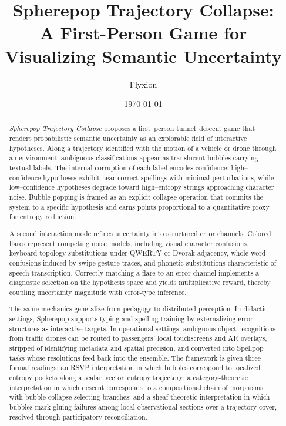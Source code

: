 \documentclass[11pt]{article}
\begin{document}
\title{Spherepop Trajectory Collapse:\\
A First-Person Game for Visualizing Semantic Uncertainty}

\author{Flyxion}

\date{\today}

\maketitle

\begin{abstract}
\noindent
\emph{Spherepop Trajectory Collapse} proposes a first--person tunnel--descent game that renders probabilistic semantic uncertainty as an explorable field of interactive hypotheses. Along a trajectory identified with the motion of a vehicle or drone through an environment, ambiguous classifications appear as translucent bubbles carrying textual labels. The internal corruption of each label encodes confidence: high--confidence hypotheses exhibit near-correct spellings with minimal perturbations, while low--confidence hypotheses degrade toward high--entropy strings approaching character noise. Bubble popping is framed as an explicit collapse operation that commits the system to a specific hypothesis and earns points proportional to a quantitative proxy for entropy reduction.

A second interaction mode refines uncertainty into structured error channels. Colored flares represent competing noise models, including visual character confusions, keyboard-topology substitutions under QWERTY or Dvorak adjacency, whole-word confusions induced by swipe-gesture traces, and phonetic substitutions characteristic of speech transcription. Correctly matching a flare to an error channel implements a diagnostic selection on the hypothesis space and yields multiplicative reward, thereby coupling uncertainty magnitude with error-type inference.

The same mechanics generalize from pedagogy to distributed perception. In didactic settings, Spherepop supports typing and spelling training by externalizing error structures as interactive targets. In operational settings, ambiguous object recognitions from traffic drones can be routed to passengers’ local touchscreens and AR overlays, stripped of identifying metadata and spatial precision, and converted into Spellpop tasks whose resolutions feed back into the ensemble. The framework is given three formal readings: an RSVP interpretation in which bubbles correspond to localized entropy pockets along a scalar--vector--entropy trajectory; a category-theoretic interpretation in which descent corresponds to a compositional chain of morphisms with bubble collapse selecting branches; and a sheaf-theoretic interpretation in which bubbles mark gluing failures among local observational sections over a trajectory cover, resolved through participatory reconciliation.
\end{abstract}
\end{document}
